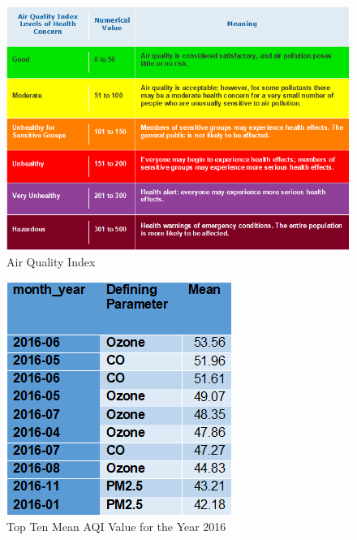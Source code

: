 \documentclass[sigconf]{acmart}
\begin{document}
\begin{figure}[htb]
\includegraphics[width=1.0\columnwidth]{images/aqiclassification.png}
  \caption{Air Quality Index \cite{airnow-gov}}
  \label{AQI}
\end{figure}


\begin{figure}[htb]
\includegraphics[width=1.0\columnwidth]{images/top10meanaqi2016.png}
  \caption{Top Ten Mean AQI Value for the Year 2016}
  \label{Top Ten Mean AQI Value for the Year 2016}
\end{figure}
\end{document}
